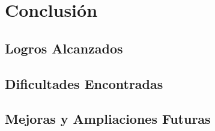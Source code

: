 
\chapter{Conclusión}\label{conclusion}

\section{Logros Alcanzados}

\section{Dificultades Encontradas}

\section{Mejoras y Ampliaciones Futuras}